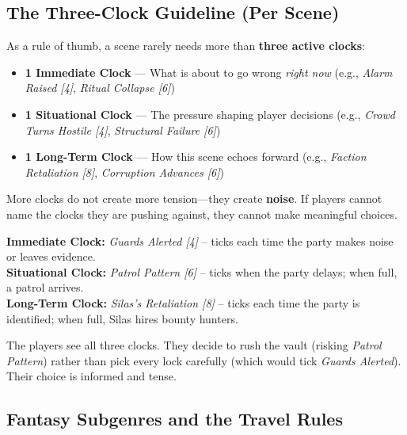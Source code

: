 \subsection{The Three-Clock Guideline (Per Scene)}
\label{subsec:three-clock-guideline}

As a rule of thumb, a scene rarely needs more than \textbf{three active clocks}:
\begin{itemize}
  \item \textbf{1 Immediate Clock} — What is about to go wrong \emph{right now} (e.g., \emph{Alarm Raised [4]}, \emph{Ritual Collapse [6]})
  \item \textbf{1 Situational Clock} — The pressure shaping player decisions (e.g., \emph{Crowd Turns Hostile [4]}, \emph{Structural Failure [6]})
  \item \textbf{1 Long-Term Clock} — How this scene echoes forward (e.g., \emph{Faction Retaliation [8]}, \emph{Corruption Advances [6]})
\end{itemize}
More clocks do not create more tension—they create \textbf{noise}. If players cannot name the clocks they are pushing against, they cannot make meaningful choices.

\begin{tcolorbox}[colback=blue!5!white, colframe=blue!75!black, title=Concrete Example: The Heist at Lord Silas’s Manor]
  \textbf{Immediate Clock:} \emph{Guards Alerted [4]} – ticks each time the party makes noise or leaves evidence.\\
  \textbf{Situational Clock:} \emph{Patrol Pattern [6]} – ticks when the party delays; when full, a patrol arrives.\\
  \textbf{Long-Term Clock:} \emph{Silas’s Retaliation [8]} – ticks each time the party is identified; when full, Silas hires bounty hunters.
  
  \vspace{2mm}
  The players see all three clocks. They decide to rush the vault (risking \emph{Patrol Pattern}) rather than pick every lock carefully (which would tick \emph{Guards Alerted}). Their choice is informed and tense.
\end{tcolorbox}

\subsection{Fantasy Subgenres and the Travel Rules}
\label{subsec:travel-subgenres}

